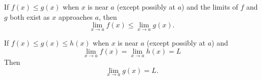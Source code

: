 \begin{frame}
\begin{theorem}
If $f(x) \leq g(x)$ when $x$ is near $a$ (except possibly at $a$) and the limits of $f$ and $g$ both exist as $x$ approaches $a$, then 
\[
\lim_{x\rightarrow a}f(x) \leq \lim_{x\rightarrow a} g(x).
\]
\end{theorem}
\begin{theorem}
If $f(x) \leq g(x) \leq h(x)$ when $x$ is near $a$ (except possibly at $a$) and
\[
\lim_{x\rightarrow a} f(x) = \lim_{x\rightarrow a} h(x) = L
\]
Then
\[
\lim_{x\rightarrow a}g(x) = L.
\]
\end{theorem}
\end{frame}
